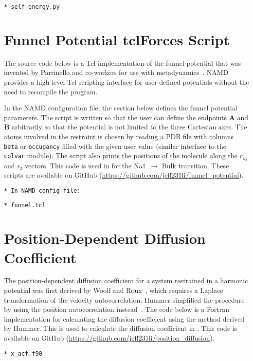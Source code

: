 \vspace{0.5cm}
\verb+* self-energy.py+


\chapter{Funnel Potential tclForces Script}
\label{apx:funnel}
The source code below is a Tcl implementation of the funnel potential that was invented by Parrinello 
and co-workers for use with metadynamics~\cite{Limongelli2013}. NAMD provides a high-level Tcl 
scripting interface for user-defined potentials without the need to recompile the program. 

In the NAMD configuration file, the section below defines the funnel potential parameters. The script 
is written so that the user can define the endpoints \textbf{A} and \textbf{B} arbitrarily so that the 
potential is not limited to the three Cartesian axes. The atoms involved in the restraint is chosen 
by reading a PDB file with columns \verb+beta+ or \verb+occupancy+ filled with the given user value 
(similar interface to the \verb+colvar+ module). The script also prints the positions of the molecule 
along the $r_{\text{xy}}$ and $r_{\text{z}}$ vectors. This code is used in  for 
the Na1\dprim\ $\rightarrow$ Bulk transition. These scripts are available on GitHub (\url{https://github.com/jeff231li/funnel_potential}).

\vspace{0.5cm}
\verb+* In NAMD config file: +

\vspace{0.5cm}
\verb+* funnel.tcl+


\chapter{Position-Dependent Diffusion Coefficient}
\label{apx:diff}


\vskip 0.5cm

The position-dependent diffusion coefficient for a system restrained in a harmonic potential was first 
derived by Woolf and Roux~\cite{Woolf1994}, which requires a Laplace transformation of the velocity 
autocorrelation. Hummer simplified the procedure by using the position autocorrelation 
instead~\cite{Hummer2005}. The code below is a Fortran implementation for calculating the diffusion 
coefficient using the method derived by Hummer. This is used to calculate the diffusion coefficient in 
. This code is available on GitHub (\url{https://github.com/jeff231li/position_diffusion}).

\vspace{0.5cm}
\verb+* x_acf.f90+


